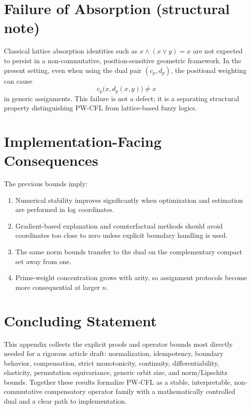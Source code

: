 \documentclass[11pt]{article}
\begin{document}
\section{Failure of Absorption (structural note)}
Classical lattice absorption identities such as $x \wedge (x \vee y)=x$ are not expected to persist in a non-commutative, position-sensitive geometric framework. In the present setting, even when using the dual pair $(c_p,d_p)$, the positional weighting can cause
\[
 c_p\bigl(x,d_p(x,y)\bigr) \ne x
\]
in generic assignments. This failure is not a defect; it is a separating structural property distinguishing PW-CFL from lattice-based fuzzy logics.

\section{Implementation-Facing Consequences}
The previous bounds imply:
\begin{enumerate}[label=\arabic*.]
  \item Numerical stability improves significantly when optimization and estimation are performed in log coordinates.
  \item Gradient-based explanation and counterfactual methods should avoid coordinates too close to zero unless explicit boundary handling is used.
  \item The same norm bounds transfer to the dual on the complementary compact set away from one.
  \item Prime-weight concentration grows with arity, so assignment protocols become more consequential at larger $n$.
\end{enumerate}

\section{Concluding Statement}
This appendix collects the explicit proofs and operator bounds most directly needed for a rigorous article draft: normalization, idempotency, boundary behavior, compensation, strict monotonicity, continuity, differentiability, elasticity, permutation equivariance, generic orbit size, and norm/Lipschitz bounds. Together these results formalize PW-CFL as a stable, interpretable, non-commutative compensatory operator family with a mathematically controlled dual and a clear path to implementation.
\nocite{*}
  
  
\end{document}

